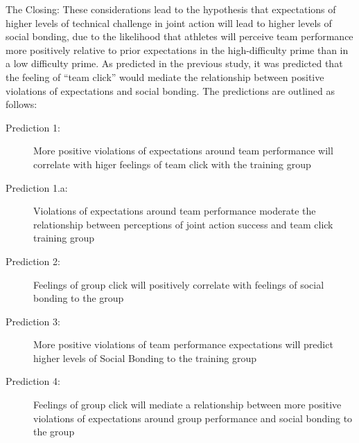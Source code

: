\documentclass[english]{article}\usepackage[]{graphicx}\usepackage[]{color}
\begin{document}




The Closing:
These considerations lead to the hypothesis that expectations of higher levels of technical challenge in joint action will lead to higher levels of social bonding, due to the likelihood that athletes will perceive team performance more positively relative to prior expectations in the high-difficulty prime than in a low difficulty prime.  As predicted in the previous study, it was predicted that the feeling of ``team click'' would mediate the relationship between positive violations of expectations and social bonding.  The predictions are outlined as follows:
\begin{description}
\item[Prediction 1:] More positive violations of expectations around team performance will correlate with higer feelings of team click with the training group
\item[Prediction 1.a:] Violations of expectations around team performance moderate the relationship between perceptions of joint action success and team click training group
\item[Prediction 2:] Feelings of group click will positively correlate with feelings of social bonding to the group
\item[Prediction 3:] More positive violations of team performance expectations will predict higher levels of Social Bonding to the training group
\item[Prediction 4:] Feelings of group click will mediate a relationship between more positive violations of expectations around group performance and social bonding to the group
\end{description}
\end{document}
